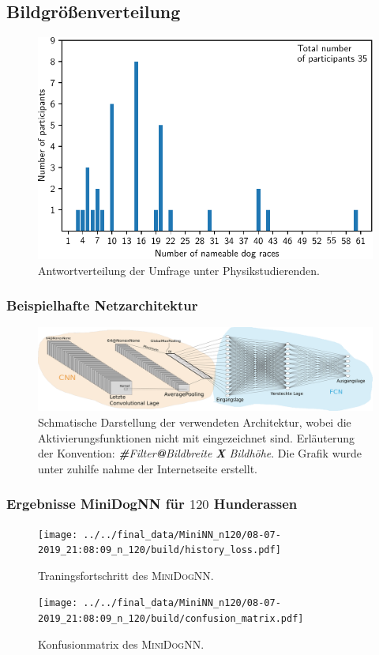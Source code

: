 \subsection{Bildgrößenverteilung}
\begin{figure}
\centering
\includegraphics[width=\the\textwidth]{./survey/answers_plot.pdf}
\caption{Antwortverteilung der Umfrage unter Physikstudierenden.}
\label{fig:Antwortverteilung}
\end{figure}
\FloatBarrier
\subsubsection{Beispielhafte Netzarchitektur}
\FloatBarrier
\begin{figure}
\centering
\includegraphics[width=\the\textwidth]{../../final_data/general/sample_network.pdf}
\caption{Schmatische Darstellung der verwendeten Architektur, wobei
         die Aktivierungsfunktionen nicht mit eingezeichnet sind. Erläuterung der Konvention: \emph{\textbf{\#}Filter\textbf{@}Bildbreite \textbf{X} Bildhöhe}.
         Die Grafik wurde unter zuhilfe nahme der Internetseite \cite{net_svg_source} erstellt.}
\label{fig:beispielhafte_netz_architecture}
\end{figure}
\FloatBarrier
\subsubsection{Ergebnisse MiniDogNN für $120$ Hunderassen}
\FloatBarrier
\begin{figure}
\centering
\centering
\texttt{[image: ../../final\_data/MiniNN\_n120/08-07-2019\_21:08:09\_n\_120/build/history\_loss.pdf]}
\caption{Traningsfortschritt des \textsc{MiniDogNN}.}
\label{fig:MiniDogNN_120_Loss_Acc}
\end{figure}
\begin{figure}
\centering
\texttt{[image: ../../final\_data/MiniNN\_n120/08-07-2019\_21:08:09\_n\_120/build/confusion\_matrix.pdf]}
\caption{Konfusionmatrix des \textsc{MiniDogNN}.}
\label{fig:MiniDogNN_120_Konfusionmatrix}
\end{figure}
\FloatBarrier
